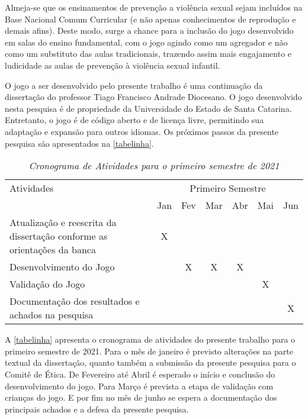 Almeja-se que os ensinamentos de prevenção a violência sexual sejam incluídos na Base Nacional Comum Curricular (e não apenas conhecimentos de reprodução e demais afins). Deste modo, surge a chance para a inclusão do jogo desenvolvido em salas do ensino fundamental, com o jogo agindo como um agregador e não como um substituto das aulas tradicionais, trazendo assim mais engajamento e ludicidade as aulas de prevenção à violência sexual infantil.

    

O jogo a ser desenvolvido pelo presente trabalho é uma continuação da dissertação do professor Tiago Francisco Andrade Diocesano. %
O jogo desenvolvido nesta pesquisa é de propriedade da Universidade do Estado de Santa Catarina. Entretanto, o jogo é de código aberto e de licença livre, permitindo sua adaptação e expansão para outros idiomas. Os próximos passos da presente pesquisa são apresentados na \autoref{tabelinha}.


\begin{table}[!htb]
    \centering
    \renewcommand{\arraystretch}{1.5} %
    \begin{tabular}{|p{9cm}|c|c|c|c|c|c|}
    \hline
    Atividades & \multicolumn{6}{|c|}{Primeiro Semestre} \\
    \cline{2-7}                                                                             & Jan   & Fev   & Mar   & Abr   & Mai   & Jun   \\
    \hline Atualização e reescrita da dissertação conforme as orientações da banca          & X     &       &       &       &       &       \\
    \hline Desenvolvimento do Jogo                                                          &       & X     & X     & X     &       &       \\
    \hline Validação do Jogo                                                                &       &       &       &       & X     &       \\
    \hline Documentação dos resultados e achados na pesquisa                                &       &       &       &       &       & X     \\
    \hline
    \end{tabular} \caption{\emph{Cronograma de Atividades para o primeiro semestre de 2021}}\label{tabelinha}
\end{table}


A \autoref{tabelinha} apresenta o cronograma de atividades do presente trabalho para o primeiro semestre de 2021. Para o mês de janeiro é previsto alterações na parte textual da dissertação, quanto também a submissão da presente pesquisa para o Comitê de Ética. De Fevereiro até Abril é esperado o início e conclusão do desenvolvimento do jogo. Para Março é prevista a etapa de validação com crianças do jogo. E por fim no mês de junho se espera a documentação dos principais achados e a defesa da presente pesquisa. 


